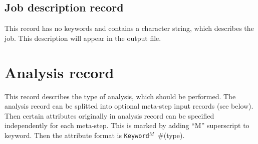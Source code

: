 \documentclass[a4paper]{report}
\newcommand{\param}[1]{\texttt{#1}} %
\newcommand{\field}[2]{\param{#1}~\#{\tiny(#2)}} %
\begin{document}
\section{Job description record}
\label{_JobDescriptionRecord}
This record has no keywords and contains a character string, which
describes the job. This description will appear in the output
file.

\chapter{Analysis record}
\label{_AnalysisRecord}
This record describes the type of analysis, which should be
performed. The analysis record can be splitted into optional meta-step input records (see below). 
Then certain attributes originally in analysis record can be specified independently for each meta-step. This is marked by
adding ``M'' superscript to keyword. Then the attribute format is \field{Keyword$^M$}{type}.
\end{document}

